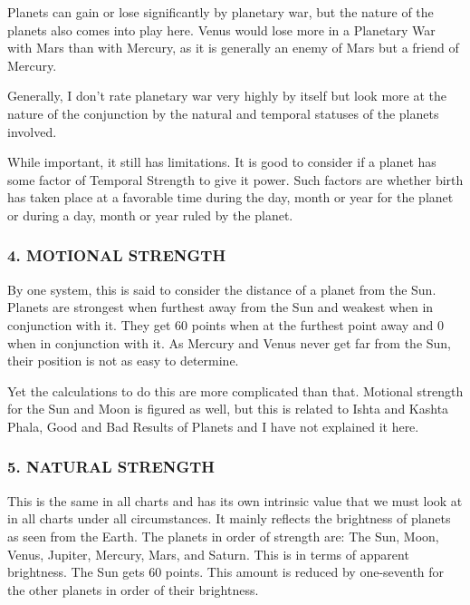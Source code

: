  

Planets can gain or lose significantly by planetary war, but the nature of the planets also comes into play here. Venus would lose more in a Planetary War with Mars than with Mercury, as it is generally an enemy of Mars but a friend of Mercury.

 

Generally, I don’t rate planetary war very highly by itself but look more at the nature of the conjunction by the natural and temporal statuses of the planets involved.

 


 

While important, it still has limitations. It is good to consider if a planet has some factor of Temporal Strength to give it power. Such factors are whether birth has taken place at a favorable time during the day, month or year for the planet or during a day, month or year ruled by the planet.

 

\subsubsection{4. MOTIONAL STRENGTH}
 

By one system, this is said to consider the distance of a planet from the Sun. Planets are strongest when furthest away from the Sun and weakest when in conjunction with it. They get 60 points when at the furthest point away and 0 when in conjunction with it. As Mercury and Venus never get far from the Sun, their position is not as easy to determine.

 

Yet the calculations to do this are more complicated than that. Motional strength for the Sun and Moon is figured as well, but this is related to Ishta and Kashta Phala, Good and Bad Results of Planets and I have not explained it here.

 


\subsubsection{5. NATURAL STRENGTH}
 

This is the same in all charts and has its own intrinsic value that we must look at in all charts under all circumstances. It mainly reflects the brightness of planets as seen from the Earth. The planets in order of strength are: The Sun, Moon, Venus, Jupiter, Mercury, Mars, and Saturn. This is in terms of apparent brightness. The Sun gets 60 points. This amount is reduced by one-seventh for the other planets in order of their brightness.

